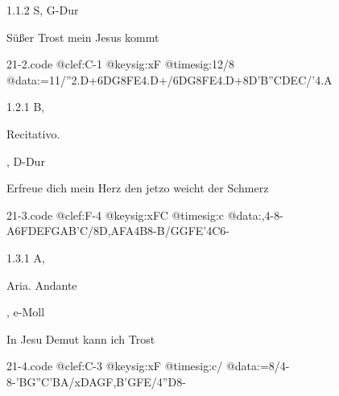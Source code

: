 \documentclass[a4paper, twocolumn, 11pt]{book}
\begin{document}
\newline %
\par 1.1.2  S, G-Dur\newline \begin{footnotesize} Süßer Trost mein Jesus kommt \end{footnotesize}  
\begin{filecontents*}{21-2.code}
@clef:C-1
@keysig:xF
@timesig:12/8
@data:=11/''2.D+{6DG8F}E4.D+/{6DG8F}E4.D+8D'B''C{DE}C/'4.A
\end{filecontents*}

\newline %
\par 1.2.1  B, \begin{itshape}Recitativo.\end{itshape}, D-Dur\newline \begin{footnotesize} Erfreue dich mein Herz den jetzo weicht der Schmerz \end{footnotesize}  
\begin{filecontents*}{21-3.code}
@clef:F-4
@keysig:xFC
@timesig:c
@data:,4-8-A{6FDEFGAB'C}/8D,AFA4B8-B/GGFE'4C6-
\end{filecontents*}

\newline %
\par 1.3.1  A, \begin{itshape}Aria. Andante\end{itshape}, e-Moll\newline \begin{footnotesize} In Jesu Demut kann ich Trost \end{footnotesize}  
\begin{filecontents*}{21-4.code}
@clef:C-3
@keysig:xF
@timesig:c/
@data:=8/4-8-'B{G''C}{'BA}/{xDA}{GF}{,B'G}{FE}/4''D8-
\end{filecontents*}
\end{document}

